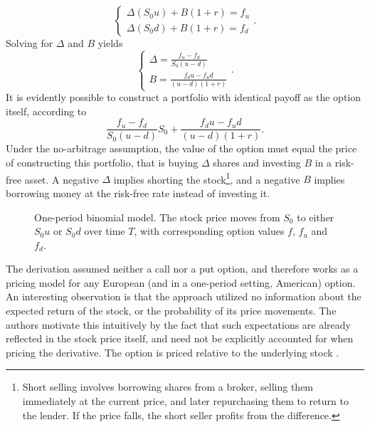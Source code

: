 \documentclass[english,12pt,a4paper,pdftex,sci,utf8]{aaltothesis}
\begin{document}
\begin{equation*}
\begin{cases}
    \Delta (S_0u) + B(1+r) = f_u\\
    \Delta (S_0d) + B(1+r) = f_d
\end{cases}.
\end{equation*}
Solving for $\Delta$ and $B$ yields
\begin{equation*}
\begin{cases}
    \Delta = \frac{f_u - f_d}{S_0(u-d)}\\
    B = \frac{f_du-f_ud}{(u-d)(1+r)}
\end{cases}.
\end{equation*}
It is evidently possible to construct a portfolio with identical payoff as the option itself, according to
\begin{equation}
     \frac{f_u - f_d}{S_0(u-d)} S_0 + \frac{f_du-f_ud}{(u-d)(1+r)}
\label{eq:replicating-portfolio}.
\end{equation}
Under the no-arbitrage assumption, the value of the option must equal the price of constructing this portfolio, that is buying $\Delta$ shares and investing $B$ in a risk-free asset. A negative $\Delta$ implies shorting the stock\footnote{Short selling involves borrowing shares from a broker, selling them immediately at the current price, and later repurchasing them to return to the lender. If the price falls, the short seller profits from the difference.}, and a negative $B$ implies borrowing money at the risk-free rate instead of investing it.
\begin{figure}[htbp]
    \centering
    \caption{One-period binomial model. The stock price moves from $S_0$ to either $S_0u$ or $S_0d$ over time $T$, with corresponding option values $f$, $f_u$ and $f_d$.}
    \label{fig:oneperiodbinom}
\end{figure}
The derivation assumed neither a call nor a put option, and therefore works as a pricing model for any European (and in a one-period setting, American) option. An interesting observation is that the approach utilized no information about the expected return of the stock, or the probability of its price movements. The authors motivate this intuitively by the fact that such expectations are already reflected in the stock price itself, and need not be explicitly accounted for when pricing the derivative. The option is priced relative to the underlying stock \cite{hull2018}.\clearpage
\end{document}
